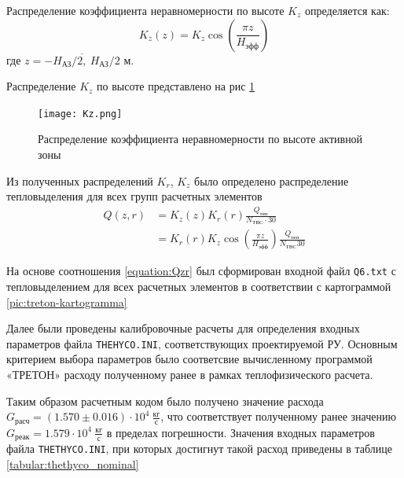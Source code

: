 \noindent Распределение коэффициента неравномерности по высоте $K_z$ определяется как:
\begin{equation}
    K_z(z) = K_z \cos \left( \frac {\pi z} {H_{\text{эфф}}} \right)
\end{equation}
где $z = \overline{-H_{\text{АЗ}} / 2,\  H_{\text{АЗ}} / 2}$ м.


\noindent Распределение $K_z$ по высоте представлено на рис \ref{pic:Kz}


\begin{figure}[H]
	\begin{center}
		\texttt{[image: Kz.png]}
		\caption{Распределение коэффициента неравномерности по высоте активной зоны}
		\label{pic:Kz}
	\end{center}
\end{figure}


Из полученных распределений $K_r$, $K_z$ было определено распределение тепловыделения для всех групп расчетных элементов
\begin{align}
    \label{equation:Qzr}
    Q(z, r) &= K_z(z)K_r(r)\frac{Q_{\text{теп}}}{N_{\text{ТВС}} \cdot 30} \\
            &= K_r(r) K_z \cos \left( \frac{\pi z}{H_{\text{эфф}}} \right) \frac{Q_{\text{теп}}}{N_{\text{ТВС}} 30}
\end{align}

На основе соотношения \ref{equation:Qzr} был сформирован входной файл \texttt{Q6.txt} с тепловыделением для всех расчетных элементов в соответствии с картограммой \ref{pic:treton-kartogramma}

Далее были проведены калибровочные расчеты для определения входных параметров файла \texttt{THEHYCO.INI}, соответствующих проектируемой РУ. Основным критерием выбора параметров было соответсвие вычисленному программой «ТРЕТОН» расходу полученному ранее в рамках теплофизического расчета.

Таким образом расчетным кодом было получено значение расхода $G_{\text{расч}} = (1.570 \pm 0.016) \cdot 10^4\  \frac{\text{кг}}{\text{с}}$, что соответствует полученному ранее значению $G_{\text{реак}} = 1.579 \cdot 10^4\ \frac{\text{кг}}{\text{с}}$ в пределах погрешности. 
Значения входных параметров файла \texttt{THETHYCO.INI}, при которых достигнут такой расход приведены в таблице \ref{tabular:thethyco_nominal}


